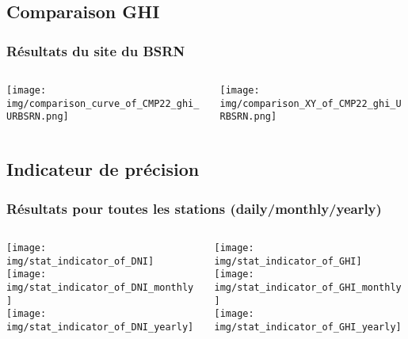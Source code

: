 \documentclass[8pt]{beamer}
\begin{document}
\subsection{Comparaison GHI}
\begin{frame}
	\frametitle{Résultats du site du BSRN}
	\begin{columns}[T] %
		\begin{column}{0.49\linewidth} %
			\centering
			\texttt{[image: img/comparison\_curve\_of\_CMP22\_ghi\_URBSRN.png]}
		\end{column}
		\begin{column}{0.49\linewidth} %
			\centering
			\texttt{[image: img/comparison\_XY\_of\_CMP22\_ghi\_URBSRN.png]}
		\end{column}
	\end{columns}
\end{frame}

\subsection{Indicateur de précision}
\begin{frame}
	\frametitle{Résultats pour toutes les stations (daily/monthly/yearly)}
	\begin{columns}[T] %
		\begin{column}{0.49\linewidth} %
			\centering
			\texttt{[image: img/stat\_indicator\_of\_DNI]}\\
			\texttt{[image: img/stat\_indicator\_of\_DNI\_monthly]}\\
			\texttt{[image: img/stat\_indicator\_of\_DNI\_yearly]}
		\end{column}
		\begin{column}{0.49\linewidth} %
			\centering
			\texttt{[image: img/stat\_indicator\_of\_GHI]}\\
			\texttt{[image: img/stat\_indicator\_of\_GHI\_monthly]}\\
			\texttt{[image: img/stat\_indicator\_of\_GHI\_yearly]}
		\end{column}
	\end{columns}
\end{frame}
\end{document}
